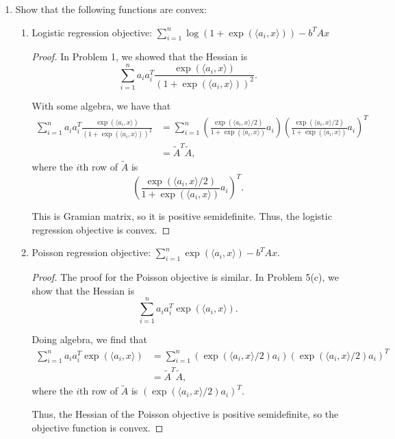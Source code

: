 \documentclass[11pt]{amsart}
\begin{document}
\begin{enumerate}
\begin{enumerate}
\item Show that the following functions are convex: 
\begin{enumerate}
\item Logistic regression objective: $\sum_{i=1}^n \log(1+\exp(\langle a_i, x\rangle))- b^TAx$
  \begin{proof}
    In Problem 1, we showed that the Hessian is
    $$\sum_{i=1}^n a_ia_i^T\frac{\exp(\langle a_i , x \rangle)}{
      \left(1 + \exp(\langle a_i , x \rangle)\right)^2}.$$

    With some algebra, we have that
    \begin{align*}
      \sum_{i=1}^n a_ia_i^T\frac{\exp(\langle a_i , x \rangle)}{
      \left(1 + \exp(\langle a_i , x \rangle)\right)^2}
      &=
      \sum_{i=1}^n \left(\frac{\exp(\langle a_i , x \rangle / 2)}{1 + \exp(\langle a_i , x \rangle)}a_i\right)
        \left(\frac{\exp(\langle a_i , x \rangle / 2)}{1 + \exp(\langle a_i , x \rangle)}a_i\right)^T \\
      &= \tilde{A}^T\tilde{A},  
    \end{align*}
    where the $i$th row of $\tilde{A}$ is
    $$
    \left(\frac{\exp(\langle a_i , x \rangle / 2)}{1 + \exp(\langle a_i , x \rangle)}a_i\right)^T.
    $$

    This is Gramian matrix, so it is positive semidefinite. Thus, the logistic
    regression objective is convex.
  \end{proof}
\item Poisson regression objective: $\sum_{i=1}^n \exp(\langle a_i, x \rangle) - b^TAx$.
  \begin{proof}
    The proof for the Poisson objective is similar. In Problem 5(c), we show
    that the Hessian is $$\sum_{i=1}^n a_ia_i^T \exp(\langle a_i, x \rangle).$$

    Doing algebra, we find that
    \begin{align*}
      \sum_{i=1}^n a_ia_i^T \exp(\langle a_i, x \rangle)
      &= \sum_{i=1}^n \left(\exp(\langle a_i, x \rangle / 2)a_i\right)\left(\exp(\langle a_i, x \rangle / 2) a_i\right)^T 
      \\
      &= \tilde{A}^T\tilde{A},
    \end{align*}
    where the $i$th row of $\tilde{A}$ is
    $\left(\exp(\langle a_i, x \rangle / 2) a_i\right)^T.$

    Thus, the Hessian of the Poisson objective is positive semidefinite, so the
    objective function is convex.
  \end{proof}
\end{enumerate}
\end{enumerate}




\end{enumerate}
\end{document}
